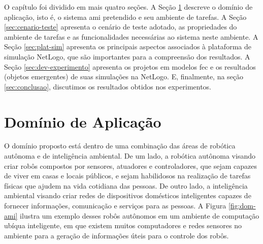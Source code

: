 O capítulo foi dividido em mais quatro seções. A Seção \ref{sec:dom-aplicacao} descreve o domínio de aplicação, isto é, o sistema \acrshort{ami} pretendido e seu ambiente de tarefas. A Seção \ref{sec:cenario-teste} apresenta o cenário de teste adotado, as propriedades do ambiente de tarefas e as funcionalidades necessárias ao sistema neste ambiente. A Seção \ref{sec:plat-sim} apresenta os principais aspectos associados à plataforma de simulação NetLogo, que são importantes para a compreensão dos resultados. A Seção \ref{sec:dev-experimento} apresenta os projetos em modelos \acrshort{fec} e os resultados (objetos emergentes) de suas simulações na NetLogo. E, finalmente, na seção \ref{sec:conclusao}, discutimos os resultados obtidos nos experimentos. 

\section{Domínio de Aplicação}
\label{sec:dom-aplicacao}

O domínio proposto está dentro de uma combinação das áreas de robótica autônoma e de inteligência ambiental. De um lado, a robótica autônoma visando criar robôs compostos por sensores, atuadores e controladores, que sejam capazes de viver em casas e locais públicos, e sejam habilidosos na realização de tarefas físicas que ajudem na vida cotidiana das pessoas. De outro lado, a inteligência ambiental visando criar redes de dispositivos domésticos inteligentes capazes de fornecer informações, comunicação e serviços para as pessoas. A Figura \ref{fig:dom-ami} ilustra um exemplo desses robôs autônomos em um ambiente de computação ubíqua inteligente, em que existem muitos computadores e redes sensores no ambiente para a geração de informações úteis para o controle dos robôs.

\begin{figure}[h!]
    \centering
\end{figure}

